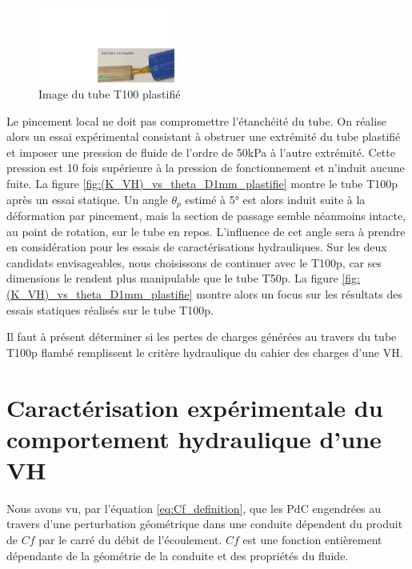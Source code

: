 \begin{figure}[!htb]
	\begin{center}
		\captionsetup{justification=centering}
		\includegraphics[trim={15cm 0cm 0cm 11cm},clip,width=0.4\textwidth]{../Chap4/Figure/plastification_tube.pdf}
		\caption{Image du tube T100 plastifié}
		\label{fig:plastification_tube}
	\end{center}
\end{figure}

Le pincement local ne doit pas compromettre l'étanchéité du tube. On réalise alors un essai expérimental consistant à obstruer une extrémité du tube plastifié et imposer une pression de fluide de l'ordre de 50kPa à l'autre extrémité. Cette pression est 10 fois supérieure à la pression de fonctionnement et n'induit aucune fuite. La figure \ref{fig:(K_VH)_vs_theta_D1mm_plastifie} montre le tube T100p après un essai statique. Un angle $\theta_p$ estimé à \ang{5} est alors induit suite à la déformation par pincement, mais la section de passage semble néanmoins intacte, au point de rotation, sur le tube en repos. L'influence de cet angle sera à prendre en considération pour les essais de caractérisations hydrauliques. Sur les deux candidats envisageables, nous choisissons de continuer avec le T100p, car ses dimensions le rendent plus manipulable que le tube T50p. La figure \ref{fig:(K_VH)_vs_theta_D1mm_plastifie} montre alors un focus sur les résultats des essais statiques réalisés sur le tube T100p. 

Il faut à présent déterminer si les pertes de charges générées au travers du tube T100p flambé remplissent le critère hydraulique du cahier des charges d'une VH.     
\section{Caractérisation expérimentale du comportement hydraulique d'une VH}
\label{sec:4.4_Caractérisations hydrauliques}
Nous avons vu, par l'équation \ref{eq:Cf_definition}, que les PdC engendrées au travers d'une perturbation géométrique dans une conduite dépendent du produit de $Cf$ par le carré du débit de l'écoulement. $Cf$ est une fonction entièrement dépendante de la géométrie de la conduite et des propriétés du fluide. 

